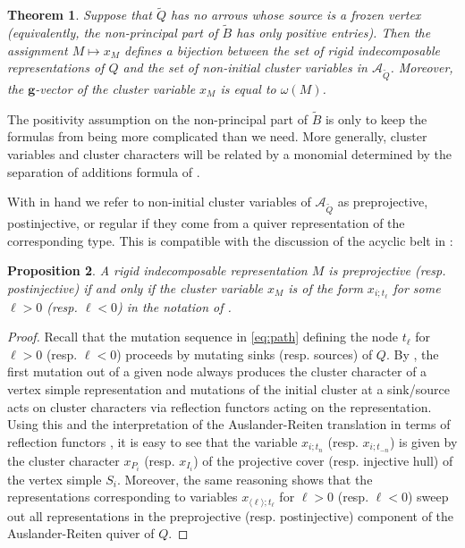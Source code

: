 \documentclass[12pt]{amsart}
\newcommand{\cA}{\mathcal{A}}
\newcommand{\bfg}{\mathbf{g}}
\newcommand{\gv}{\omega}
\newcommand{\grep}{\gv}
\newcommand{\Qrep}{M}
\newcommand{\Zidx}{\ell}
\newtheorem{theorem}{Theorem}[section]
\newtheorem{proposition}[theorem]{Proposition}
\theoremstyle{remark}
\numberwithin{equation}{section}
\numberwithin{figure}{section}
\begin{document}
\begin{theorem}\label{thm:CCbijection}\cite{CC,CK}
Suppose that $\widetilde{Q}$ has no arrows whose source is a frozen vertex (equivalently, the non-principal part of $\widetilde{B}$ has only positive entries).
Then the assignment $M \mapsto x_M$ defines a bijection between the set of rigid indecomposable representations of $Q$ and the set of non-initial cluster variables in $\cA_{\widetilde{Q}}$.
Moreover, the $\bfg$-vector of the cluster variable $x_M$ is equal to $\grep(M)$.
\end{theorem}

The positivity assumption on the non-principal part of $\widetilde{B}$ is only to keep the formulas from being more complicated than we need. 
More generally, cluster variables and cluster characters will be related by a monomial determined by the separation of additions formula of \cite{FZ07}.

With  in hand we refer to non-initial cluster variables of $\cA_{\widetilde{Q}}$ as preprojective, postinjective, or regular if they come from a quiver representation of the corresponding type. This is compatible with the discussion of the acyclic belt in :

\begin{proposition}\label{prop:ccvsacyclicbelt}
A rigid indecomposable representation $\Qrep$ is preprojective (resp. postinjective) if and only if the cluster variable $x_M$ is of the form $x_{i;t_\Zidx}$ for some $\Zidx > 0$ (resp. $\Zidx < 0$) in the notation of .
\end{proposition}
\begin{proof}
  Recall that the mutation sequence in \eqref{eq:path} defining the node $t_\Zidx$ for $\Zidx>0$ (resp. $\Zidx<0$) proceeds by mutating sinks (resp. sources) of $Q$.  
  By \cite{DWZ10,Ru11}, the first mutation out of a given node always produces the cluster character of a vertex simple representation and mutations of the initial cluster at a sink/source acts on cluster characters via reflection functors acting on the representation.  
  Using this and the interpretation of the Auslander-Reiten translation in terms of reflection functors \cite{BB76}, it is easy to see that the variable $x_{i;t_n}$ (resp. $x_{i;t_{-n}}$) is given by the cluster character $x_{P_i}$ (resp. $x_{I_i}$) of the projective cover (resp. injective hull) of the vertex simple $S_i$.  Moreover, the same reasoning shows that the representations corresponding to variables $x_{\langle\Zidx\rangle;t_{\Zidx}}$ for $\Zidx>0$ (resp. $\Zidx<0$) sweep out all representations in the preprojective (resp. postinjective) component of the Auslander-Reiten quiver of $Q$.
\end{proof}
\end{document}
